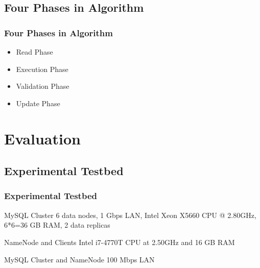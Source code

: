 \documentclass{beamer}
\begin{document}
\subsection{Four Phases in Algorithm}
\begin{frame}
	\frametitle{Four Phases in Algorithm}
	\begin{itemize}
		\item Read Phase
		\item Execution Phase
		\item Validation Phase
		\item Update Phase
	\end{itemize}
\end{frame}

\section{Evaluation}

\subsection{Experimental Testbed}
\begin{frame}
	\frametitle{Experimental Testbed}
	\begin{block}{MySQL Cluster}
		6 data nodes, 1 Gbps LAN, Intel Xeon X5660 CPU @ 2.80GHz, 6*6=36 GB RAM, 2 data replicas
	\end{block}
	\begin{block}{NameNode and Clients}
		Intel i7-4770T CPU at 2.50GHz and 16 GB RAM
	\end{block}
	\begin{block}{MySQL Cluster and NameNode}
		100 Mbps LAN
	\end{block}
\end{frame}
\end{document}
